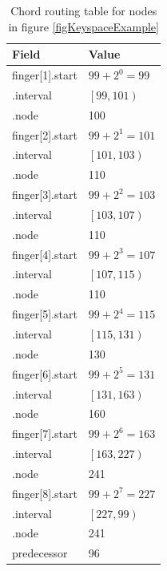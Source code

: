 \begin{table}[h]
\caption{Chord routing table for nodes in figure \ref{figKeyspaceExample}}
\begin{center}
\begin{tabular}{ | l | l | }
  \hline                       
  Field & Value \\
  \hline  
  \hline  
  finger[1].start & $ 99 + 2^{0} = 99 $ \\
  \hline  
  \;.interval & $ \left[ 99, 101 \right) $ \\
  \hline  
  \;.node & 100 \\
  \hline  
  finger[2].start & $ 99 + 2^{1} = 101 $ \\
  \hline  
  \;.interval & $ \left[ 101, 103 \right) $ \\
  \hline  
  \;.node & 110 \\
  \hline  
  finger[3].start & $ 99 + 2^{2} = 103 $ \\
  \hline  
  \;.interval & $ \left[ 103, 107 \right) $ \\
  \hline  
  \;.node & 110 \\
  \hline  
  finger[4].start & $ 99 + 2^{3} = 107 $ \\
  \hline  
  \;.interval & $ \left[ 107, 115 \right) $ \\
  \hline  
  \;.node & 110 \\
  \hline  
  finger[5].start & $ 99 + 2^{4} = 115 $ \\
  \hline  
  \;.interval & $ \left[ 115, 131 \right) $ \\
  \hline  
  \;.node & 130 \\
  \hline  
  finger[6].start & $ 99 + 2^{5} = 131 $ \\
  \hline  
  \;.interval & $ \left[ 131, 163 \right) $ \\
  \hline  
  \;.node & 160 \\
  \hline  
  finger[7].start & $ 99 + 2^{6} = 163 $ \\
  \hline  
  \;.interval & $ \left[ 163, 227 \right) $ \\
  \hline  
  \;.node & 241 \\
  \hline  
  finger[8].start & $ 99 + 2^{7} = 227 $ \\
  \hline  
  \;.interval & $ \left[ 227, 99 \right) $ \\
  \hline
  \;.node & 241 \\
  \hline  
  predecessor & 96 \\
  \hline  
\end{tabular}
\end{center}
\label{tableChordRoutingTable}
\end{table}


